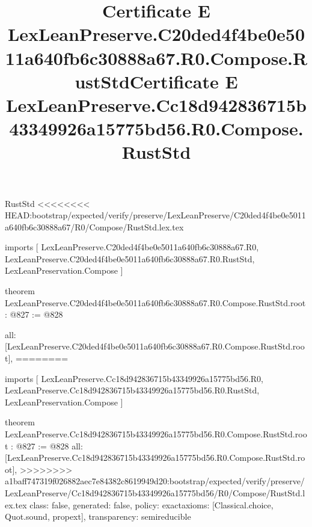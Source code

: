 \begin{lexlean}{RustStd}
<<<<<<<< HEAD:bootstrap/expected/verify/preserve/LexLeanPreserve/C20ded4f4be0e5011a640fb6c30888a67/R0/Compose/RustStd.lex.tex
\title{Certificate E LexLeanPreserve.C20ded4f4be0e5011a640fb6c30888a67.R0.Compose.RustStd}
\begin{coremodule}
imports [
  LexLeanPreserve.C20ded4f4be0e5011a640fb6c30888a67.R0,
  LexLeanPreserve.C20ded4f4be0e5011a640fb6c30888a67.R0.RustStd,
  LexLeanPreservation.Compose
]

theorem LexLeanPreserve.C20ded4f4be0e5011a640fb6c30888a67.R0.Compose.RustStd.root : @827 := @828 {
  all: [LexLeanPreserve.C20ded4f4be0e5011a640fb6c30888a67.R0.Compose.RustStd.root],
========
\title{Certificate E LexLeanPreserve.Cc18d942836715b43349926a15775bd56.R0.Compose.RustStd}
\begin{coremodule}
imports [
  LexLeanPreserve.Cc18d942836715b43349926a15775bd56.R0,
  LexLeanPreserve.Cc18d942836715b43349926a15775bd56.R0.RustStd,
  LexLeanPreservation.Compose
]

theorem LexLeanPreserve.Cc18d942836715b43349926a15775bd56.R0.Compose.RustStd.root : @827 := @828 {
  all: [LexLeanPreserve.Cc18d942836715b43349926a15775bd56.R0.Compose.RustStd.root],
>>>>>>>> a1baff747319f026882aec7e84382c8619949d20:bootstrap/expected/verify/preserve/LexLeanPreserve/Cc18d942836715b43349926a15775bd56/R0/Compose/RustStd.lex.tex
  class: false,
  generated: false,
  policy: exact{axioms: [Classical.choice, Quot.sound, propext]},
  transparency: semireducible
}


\end{coremodule}}
\end{coremodule}
\end{lexlean}
